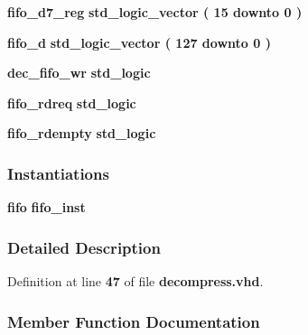 \begin{DoxyCompactItemize}
\item 
{\bf fifo\+\_\+d7\+\_\+reg} {\bfseries \textcolor{comment}{std\+\_\+logic\+\_\+vector}\textcolor{vhdlchar}{ }\textcolor{vhdlchar}{(}\textcolor{vhdlchar}{ }\textcolor{vhdlchar}{ } \textcolor{vhdldigit}{15} \textcolor{vhdlchar}{ }\textcolor{keywordflow}{downto}\textcolor{vhdlchar}{ }\textcolor{vhdlchar}{ } \textcolor{vhdldigit}{0} \textcolor{vhdlchar}{ }\textcolor{vhdlchar}{)}\textcolor{vhdlchar}{ }} 
\item 
{\bf fifo\+\_\+d} {\bfseries \textcolor{comment}{std\+\_\+logic\+\_\+vector}\textcolor{vhdlchar}{ }\textcolor{vhdlchar}{(}\textcolor{vhdlchar}{ }\textcolor{vhdlchar}{ } \textcolor{vhdldigit}{127} \textcolor{vhdlchar}{ }\textcolor{keywordflow}{downto}\textcolor{vhdlchar}{ }\textcolor{vhdlchar}{ } \textcolor{vhdldigit}{0} \textcolor{vhdlchar}{ }\textcolor{vhdlchar}{)}\textcolor{vhdlchar}{ }} 
\item 
{\bf dec\+\_\+fifo\+\_\+wr} {\bfseries \textcolor{comment}{std\+\_\+logic}\textcolor{vhdlchar}{ }} 
\item 
{\bf fifo\+\_\+rdreq} {\bfseries \textcolor{comment}{std\+\_\+logic}\textcolor{vhdlchar}{ }} 
\item 
{\bf fifo\+\_\+rdempty} {\bfseries \textcolor{comment}{std\+\_\+logic}\textcolor{vhdlchar}{ }} 
\end{DoxyCompactItemize}
\subsubsection*{Instantiations}
 \begin{DoxyCompactItemize}
\item 
{\bf fifo}  {\bfseries fifo\+\_\+inst}   
\end{DoxyCompactItemize}


\subsubsection{Detailed Description}


Definition at line {\bf 47} of file {\bf decompress.\+vhd}.



\subsubsection{Member Function Documentation}

